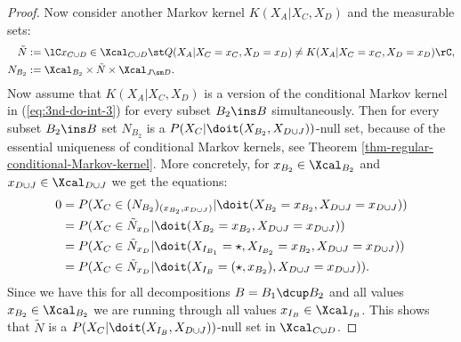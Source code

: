 \begin{Prp}
\begin{proof}
Now consider another Markov kernel $K(X_A|X_C,X_D)$ and the measurable sets:
\begin{align*}
    \tilde N &:= \lC x_{C \cup D} \in \Xcal_{C \cup D} \st Q(X_A|X_C=x_C,X_D=x_D) \neq K(X_A|X_C=x_C,X_D=x_D)  \rC,\\
    N_{B_2} &:= \Xcal_{B_2} \times \tilde N \times \Xcal_{J \sm D}.
\end{align*}
Now assume that $K(X_A|X_C,X_D)$ is a version of the conditional Markov kernel in (\ref{eq:3nd-do-int-3})
for every subset $B_2 \ins B$ simultaneously. 
Then for every subset $B_2 \ins B$ set $N_{B_2}$ is a
$P(X_C|\doit(X_{B_2},X_{D\cup J}))$-null set, because of the essential uniqueness of conditional Markov kernels, see Theorem \ref{thm-regular-conditional-Markov-kernel}. More concretely, for $x_{B_2} \in \Xcal_{B_2}$ 
and $x_{D \cup J} \in \Xcal_{D \cup J}$ we get the equations:
\begin{align*}
  0 &=P(X_C \in (N_{B_2})_{(x_{B_2},x_{D\cup J})} |\doit(X_{B_2}=x_{B_2},X_{D\cup J}=x_{D \cup J})) \\
      &=P(X_C \in \tilde N_{x_D} |\doit(X_{B_2}=x_{B_2},X_{D\cup J}=x_{D \cup J}))\\
      &=P(X_C \in \tilde N_{x_D} |\doit(X_{I_{B_1}}=\star, X_{I_{B_2}}=x_{B_2},X_{D\cup J}=x_{D \cup J}))\\
      &=P(X_C \in \tilde N_{x_D} |\doit(X_{I_B}=(\star,x_{B_2}),X_{D\cup J}=x_{D \cup J})).
\end{align*}
Since we have this for all decompositions $B=B_1 \dcup B_2$ and all values $x_{B_2} \in \Xcal_{B_2}$ 
we are running through all values $x_{I_B} \in \Xcal_{I_B}$. 
This shows that $\tilde N$ is a $P(X_C|\doit(X_{I_B},X_{D\cup J}))$-null set in $\Xcal_{C \cup D}$.
\end{proof}
\end{Prp}


